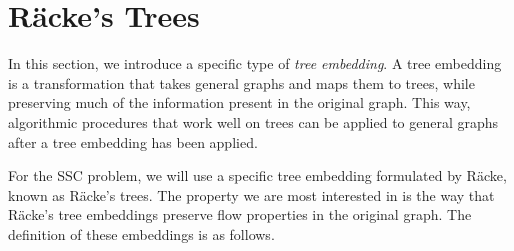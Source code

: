 \documentclass[12pt]{article}
\newtheorem{definition}{Definition}
\begin{document}
%
%

\section{R\"{a}cke's Trees}
\label{sec:rackestrees}

In this section, we introduce a specific type of \emph{tree embedding}. A tree embedding is a transformation that takes general graphs and maps them to trees, while preserving much of the information present in the original graph. This way, algorithmic procedures that work well on trees can be applied to general graphs after a tree embedding has been applied. 

For the SSC problem, we will use a specific tree embedding formulated by R\"{a}cke, known as R\"{a}cke's trees. The property we are most interested in is the way that R\"{a}cke's tree embeddings preserve flow properties in the original graph. The definition of these embeddings is as follows.
\end{document}
